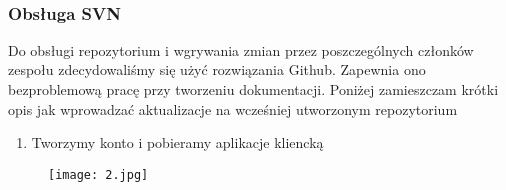 \begin{lstlisting}


\end{lstlisting}


\subsubsection{Obsługa SVN}
Do obsługi repozytorium i wgrywania zmian przez poszczególnych członków zespołu zdecydowaliśmy się użyć rozwiązania Github. Zapewnia ono bezproblemową pracę przy tworzeniu dokumentacji. \newline
Poniżej zamieszczam krótki opis jak wprowadzać aktualizacje na wcześniej utworzonym repozytorium 

\newline
\begin{enumerate}
\item Tworzymy konto i pobieramy aplikacje kliencką 
\end{enumerate}
\begin{figure}[h]
\texttt{[image: 2.jpg]}
\end{figure}
